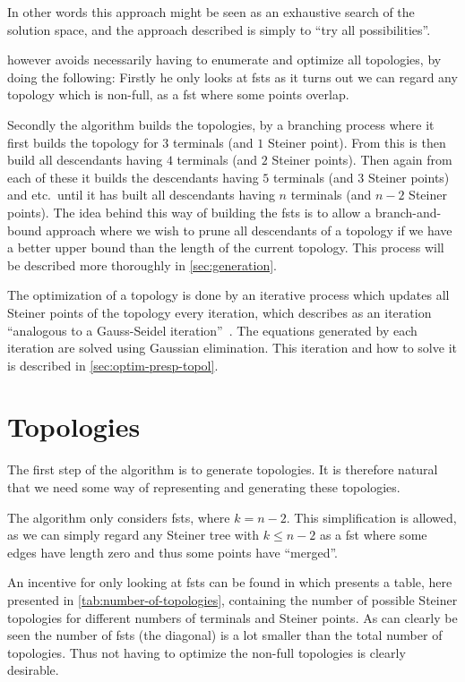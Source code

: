 In other words this approach might be seen as an exhaustive search of the
solution space, and the approach described is simply to ``try all
possibilities''.

\citeauthor{smith1992} however avoids necessarily having to enumerate and optimize all
topologies, by doing the following: Firstly he only looks at \acp{fst} as it
turns out we can regard any topology which is non-full, as a \ac{fst} where
some points overlap.

Secondly the algorithm builds the topologies, by a branching process where it
first builds the topology for $3$ terminals (and $1$ Steiner point). From this
is then build all descendants having $4$ terminals (and $2$ Steiner
points). Then again from each of these it builds the descendants having $5$
terminals (and $3$ Steiner points) and etc.\ until it has built all descendants
having $n$ terminals (and $n-2$ Steiner points). The idea behind this way of
building the \acp{fst} is to allow a branch-and-bound approach where we wish
to prune all descendants of a topology if we have a better upper bound than the
length of the current topology. This process will be described more thoroughly
in \cref{sec:generation}.

The optimization of a topology is done by an iterative process which updates all
Steiner points of the topology every iteration, which \citeauthor{smith1992}
describes as an iteration ``analogous to a Gauss-Seidel
iteration''~\cite[p.~145]{smith1992}.  The equations generated by each iteration
are solved using Gaussian elimination. This iteration and how to solve it is
described in \cref{sec:optim-presp-topol}.

\section{Topologies}
\label{sec:topologies}

The first step of the algorithm is to generate topologies. It is therefore
natural that we need some way of representing and generating these topologies.

The algorithm only considers \acp{fst}, where $k = n - 2$. This simplification
is allowed, as we can simply regard any Steiner tree with $k \le n - 2$ as a
\ac{fst} where some edges have length zero and thus some points have
``merged''.

An incentive for only looking at \acp{fst} can be found in \textcite{gilbert1968}
which presents a table, here presented in \cref{tab:number-of-topologies},
containing the number of possible Steiner topologies for different numbers of
terminals and Steiner points. As can clearly be seen the number of \acp{fst}
(the diagonal) is a lot smaller than the total number of topologies. Thus not
having to optimize the non-full topologies is clearly desirable.

